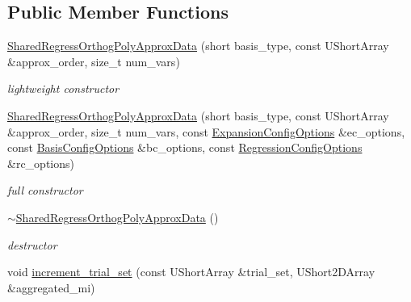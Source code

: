 \subsection*{Public Member Functions}
\begin{DoxyCompactItemize}
\item 
\hyperlink{classPecos_1_1SharedRegressOrthogPolyApproxData_a8bf7d25eb0be43dfa5a56191fa17b9d6}{Shared\+Regress\+Orthog\+Poly\+Approx\+Data} (short basis\+\_\+type, const U\+Short\+Array \&approx\+\_\+order, size\+\_\+t num\+\_\+vars)\label{classPecos_1_1SharedRegressOrthogPolyApproxData_a8bf7d25eb0be43dfa5a56191fa17b9d6}

\begin{DoxyCompactList}\small\item\em lightweight constructor \end{DoxyCompactList}\item 
\hyperlink{classPecos_1_1SharedRegressOrthogPolyApproxData_afe703c90715dd911fc3f2408e28507db}{Shared\+Regress\+Orthog\+Poly\+Approx\+Data} (short basis\+\_\+type, const U\+Short\+Array \&approx\+\_\+order, size\+\_\+t num\+\_\+vars, const \hyperlink{classPecos_1_1ExpansionConfigOptions}{Expansion\+Config\+Options} \&ec\+\_\+options, const \hyperlink{classPecos_1_1BasisConfigOptions}{Basis\+Config\+Options} \&bc\+\_\+options, const \hyperlink{classPecos_1_1RegressionConfigOptions}{Regression\+Config\+Options} \&rc\+\_\+options)\label{classPecos_1_1SharedRegressOrthogPolyApproxData_afe703c90715dd911fc3f2408e28507db}

\begin{DoxyCompactList}\small\item\em full constructor \end{DoxyCompactList}\item 
\hyperlink{classPecos_1_1SharedRegressOrthogPolyApproxData_a308182f7c1330999b43850fa809cda7c}{$\sim$\+Shared\+Regress\+Orthog\+Poly\+Approx\+Data} ()\label{classPecos_1_1SharedRegressOrthogPolyApproxData_a308182f7c1330999b43850fa809cda7c}

\begin{DoxyCompactList}\small\item\em destructor \end{DoxyCompactList}\item 
void \hyperlink{classPecos_1_1SharedRegressOrthogPolyApproxData_a8da3d668120e0f50487ccaacec22fba5}{increment\+\_\+trial\+\_\+set} (const U\+Short\+Array \&trial\+\_\+set, U\+Short2\+D\+Array \&aggregated\+\_\+mi)\label{classPecos_1_1SharedRegressOrthogPolyApproxData_a8da3d668120e0f50487ccaacec22fba5}


\end{DoxyCompactItemize}
